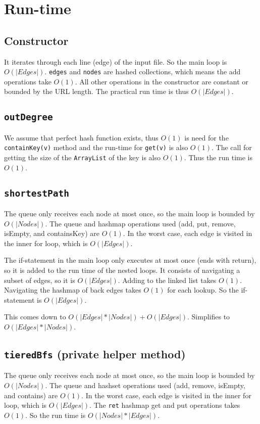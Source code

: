 \documentclass[10pt,letterpaper]{article}
\begin{document}
\section{Run-time}
\subsection{Constructor}
It iterates through each line (edge) of the input file. So the main loop is $O(|Edges|)$. \texttt{edges} and \texttt{nodes} are hashed collections, which means the add operations take $O(1)$. All other operations in the constructor are constant or bounded by the URL length. The practical run time is thus $O(|Edges|)$.
\subsection{\texttt{outDegree}}
We assume that perfect hash function exists, thus $O(1)$ is need for the \texttt{containKey(v)} method and the run-time for \texttt{get(v)} is also $O(1)$. The call for getting the size of the \texttt{ArrayList} of the key is also $O(1)$.
Thus the run time is $O(1)$.
\subsection{\texttt{shortestPath}}
The queue only receives each node at most once, so the main loop is bounded by $O(|Nodes|)$. The queue and hashmap operations used (add, put, remove, isEmpty, and containsKey) are $O(1)$. In the worst case, each edge is visited in the inner for loop, which is $O(|Edges|)$.

The if-statement in the main loop only executes at most once (ends with return), so it is added to the run time of the nested loops. It consists of navigating a subset of edges, so it is $O(|Edges|)$. Adding to the linked list takes $O(1)$. Navigating the hashmap of back edges takes $O(1)$ for each lookup. So the if-statement is $O(|Edges|)$.

This comes down to $O(|Edges|*|Nodes|)+O(|Edges|)$. Simplifies to $O(|Edges|*|Nodes|)$.
\subsection{\texttt{tieredBfs} (private helper method)}
The queue only receives each node at most once, so the main loop is bounded by $O(|Nodes|)$. The queue and hashset operations used (add, remove, isEmpty, and contains) are $O(1)$. In the worst case, each edge is visited in the inner for loop, which is $O(|Edges|)$. The \texttt{ret} hashmap get and put operations takes $O(1)$. So the run time is $O(|Nodes|*|Edges|)$.
\end{document}
